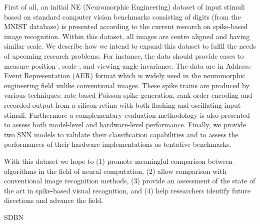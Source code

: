\documentclass[journal]{journal}
\begin{document}
	First of all, an initial NE (Neuromorphic Engineering) dataset of input stimuli based on standard computer vision benchmarks consisting of %
	digits (from the MNIST database) is presented according to the current research on spike-based image recognition.
	Within this dataset, all images are centre aligned and having similar scale.
	We describe how we intend to expand this dataset to fulfil the needs of upcoming research problems.
	For instance, the data should provide cases to measure position-, scale-, and viewing-angle invariance.
	The data are in Address-Event Representation (AER) format which is widely used in the neuromorphic engineering field unlike conventional images.
	These spike trains are produced by various techniques: rate-based Poisson spike generation, rank order encoding and recorded output from a silicon retina with both flashing and oscillating input stimuli.
	Furthermore a complementary evaluation methodology is also presented to assess both model-level and hardware-level performance.
	Finally, we provide two SNN models to validate their classification capabilities and to assess the performances of their hardware implementations as tentative benchmarks.
	
	With this dataset we hope to (1) promote meaningful comparison between algorithms in the field of neural computation, (2) allow comparison with conventional image recognition methods, (3) provide an assessment of the state of the art in spike-based visual recognition, and (4) help researchers identify future directions and advance the field.
	
	SDBN
\end{document}

